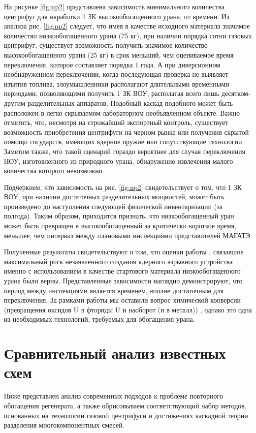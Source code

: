 На рисунке \ref{fig:np2} представлена зависимость минимального количества центрифуг для наработки 1 ЗК высокообогащенного урана, от времени.  Из анализа рис. \ref{fig:np2} следует, что имея в качестве исходного материала значимое количество низкообогащенного урана (75 кг), при наличии порядка сотни газовых центрифуг, существует возможность получить значимое количество высокообогащенного урана (25 кг) в срок меньший, чем оцениваемое время переключения, которое составляет порядка 1 года. А при диверсионном необнаруженном переключении, когда последующая проверка не выявляет изъятия топлива, злоумышленники располагают длительными временными периодами, позволяющими получить 1 ЗК ВОУ, располагая всего лишь десятком-другим разделительных аппаратов. Подобный каскад подобного может быть расположен в легко скрываемом лабораторном необъявленном объекте. Важно отметить, что, несмотря на строжайший экспортный контроль, существует возможность приобретения центрифуги на черном рынке или получения скрытой помощи государств, имеющих ядерное оружие или сопутствующие технологии. Заметим также, что такой сценарий гораздо вероятнее для случая переключения НОУ, изготовленного из природного урана, обнаружение извлечения малого количества которого невозможно. 

Подчеркнем, что зависимость на рис. \ref{fig:np2} свидетельствует о том, что 1 ЗК ВОУ, при наличии достаточных разделительных мощностей, может быть произведено до наступления следующей физической инвентаризации (за полгода). Таким образом, приходится признать, что низкообогащенный уран может быть превращен в высокообогащенный за критически короткое время, меньшее, чем интервал между плановыми инспекциями представителей МАГАТЭ. 

Полученные результаты свидетельствуют о том, что оценки работы \cite{rumyanc}, связавшие максимальный риск незаявленного создания ядерного взрывного устройства именно с использованием в качестве стартового материала низкообогащенного урана были  верны. Представленные зависимости наглядно демонстрируют, что период между инспекциями является временем, вполне достаточным для переключения. За рамками работы мы оставили вопрос химической конверсии (превращения оксидов U в фториды U и наоборот (и в металл)) \cite{Orlov2017}, однако это одна из необходимых технологий, требуемых для обогащения урана. 
      
\section{Сравнительный анализ известных схем}\label{sec:ch1/sec2}
Ниже представлен анализ современных подходов к проблеме повторного обогащения регенерата, а также обрисовываем соответствующий набор методов, основанных на технологии газовой центрифуги и достижениях каскадной теории разделения многокомпонентных смесей.
